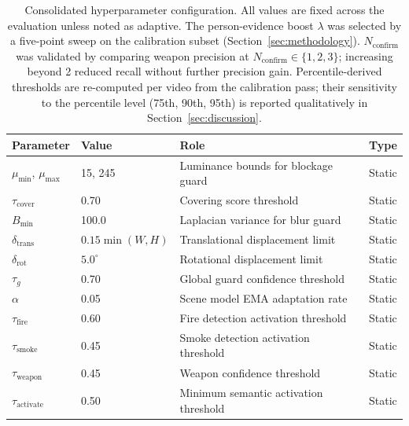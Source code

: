 \documentclass[sensors,article,submit,pdftex,moreauthors]{Definitions/mdpi}
\begin{document}
\begin{table}[H]
\caption{Consolidated hyperparameter configuration. All values are fixed across the evaluation unless noted as adaptive. The person-evidence boost $\lambda$ was selected by a five-point sweep on the calibration subset (Section~\ref{sec:methodology}). $N_{\text{confirm}}$ was validated by comparing weapon precision at $N_{\text{confirm}} \in \{1,2,3\}$; increasing beyond 2 reduced recall without further precision gain. Percentile-derived thresholds are re-computed per video from the calibration pass; their sensitivity to the percentile level (75th, 90th, 95th) is reported qualitatively in Section~\ref{sec:discussion}.}
\label{tab:method-hyper}
\label{tab:hyperparams}
\centering
\small
\setlength{\tabcolsep}{4pt}
\begin{tabular}{p{2.8cm} p{1.6cm} p{4.6cm} p{2.0cm}}
\toprule
\textbf{Parameter} & \textbf{Value} & \textbf{Role} & \textbf{Type} \\
\midrule
$\mu_{\min}$, $\mu_{\max}$          & 15, 245       & Luminance bounds for blockage guard           & Static \\
$\tau_{\text{cover}}$               & 0.70          & Covering score threshold                      & Static \\
$B_{\min}$                          & 100.0         & Laplacian variance for blur guard             & Static \\
$\delta_{\text{trans}}$             & $0.15\min(W,H)$ & Translational displacement limit            & Static \\
$\delta_{\text{rot}}$               & $5.0^\circ$   & Rotational displacement limit                 & Static \\
$\tau_g$                            & 0.70          & Global guard confidence threshold             & Static \\
$\alpha$                            & 0.05          & Scene model EMA adaptation rate               & Static \\
$\tau_{\text{fire}}$                & 0.60          & Fire detection activation threshold           & Static \\
$\tau_{\text{smoke}}$               & 0.45          & Smoke detection activation threshold          & Static \\
$\tau_{\text{weapon}}$              & 0.45          & Weapon confidence threshold                   & Static \\
$\tau_{\text{activate}}$            & 0.50          & Minimum semantic activation threshold         & Static \\

\end{tabular}
\end{table}
\end{document}
